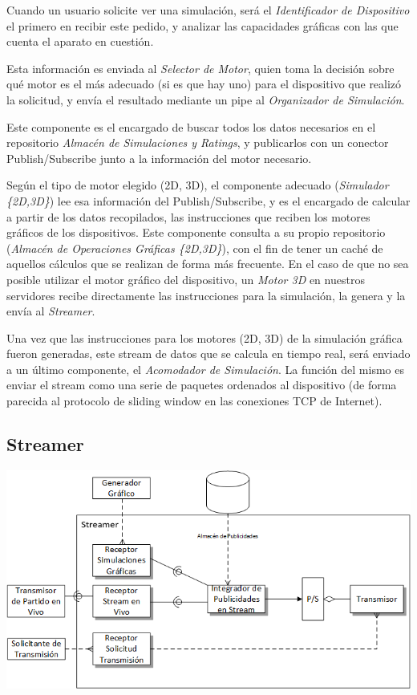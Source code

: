 Cuando un usuario solicite ver una simulación, será el \emph{Identificador de Dispositivo} el primero en recibir este pedido, y analizar las capacidades gráficas con las que cuenta el aparato en cuestión.

Esta información es enviada al \emph{Selector de Motor}, quien toma la decisión sobre qué motor es el más adecuado (si es que hay uno) para el dispositivo que realizó la solicitud, y envía el resultado mediante un pipe al \emph{Organizador de Simulación}.

Este componente es el encargado de buscar todos los datos necesarios en el repositorio \emph{Almacén de Simulaciones y Ratings}, y publicarlos con un conector Publish/Subscribe junto a la información del motor necesario.

Según el tipo de motor elegido (2D, 3D), el componente adecuado (\emph{Simulador \{2D,3D\}}) lee esa información del Publish/Subscribe, y es el encargado de calcular a partir de los datos recopilados, las instrucciones que reciben los motores gráficos de los dispositivos. Este componente consulta a su propio repositorio (\emph{Almacén de Operaciones Gráficas \{2D,3D\}}), con el fin de tener un caché de aquellos cálculos que se realizan de forma más frecuente. En el caso de que no sea posible utilizar el motor gráfico del dispositivo, un \emph{Motor 3D} en nuestros servidores recibe directamente las instrucciones para la simulación, la genera y la envía al \emph{Streamer}.

Una vez que las instrucciones para los motores (2D, 3D) de la simulación gráfica fueron generadas, este stream de datos que se calcula en tiempo real, será enviado a un último componente, el \emph{Acomodador de Simulación}. La función del mismo es enviar el stream como una serie de paquetes ordenados al dispositivo (de forma parecida al protocolo de sliding window en las conexiones TCP de Internet).


\newpage
\subsection{Streamer}
\begin{center}
\includegraphics[scale=0.86,angle=90]{diagramas/streamer}
\label{fig:streamer}
\end{center}

